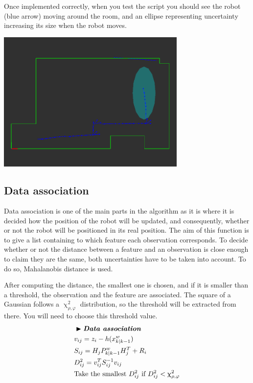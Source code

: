 \documentclass[a4paper,10pt]{article}
\begin{document}
Once implemented correctly, when you test the script you should see the robot (blue arrow) moving around the room, and an ellipse representing uncertainty increasing its size when the robot moves.

\begin{center}
	\includegraphics[width=0.70\textwidth]{pict/uncert.png}
	\label{no_updates}
\end{center}


\subsection{Data association}

Data association is one of the main parts in the algorithm as it is where it is decided how the position of the robot will be updated, and consequently, whether or not the robot will be positioned in its real position. The aim of this function is to give a list containing to which feature each observation corresponds.
To decide whether or not the distance between a feature and an observation is close enough to claim they are the same, both uncertainties have to be taken into account. To do so, Mahalanobis distance is used.

After computing the distance, the smallest one is chosen, and if it is smaller than a threshold, the observation and the feature are associated. The square of a Gaussian follows a $\upchi_{\rho,\varphi}^2$ distribution, so the threshold will be extracted from there. You will need to choose this threshold value.
\begin{align*}
    & \blacktriangleright \textit{\textbf{Data association}}\\
    & v_{ij} = z_i - h(x_{k|k-1}^w) \\
    & S_{ij} = H_j P_{k|k-1}^w H_j^T + R_i \\
    & D_{ij}^2 = v_{ij}^T S_{ij}^{-1} v_{ij} \\
    & \text{Take the smallest } D_{ij}^2 \text{ if } D_{ij}^2 < \upchi_{\rho,\varphi}^2
\end{align*}
\end{document}

